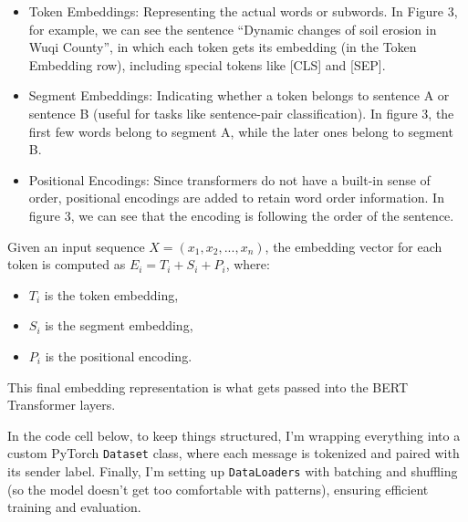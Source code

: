 \documentclass[11pt]{article}
\providecommand{\tightlist}{%
      \setlength{\itemsep}{0pt}\setlength{\parskip}{0pt}}
\begin{document}
\begin{itemize}
\tightlist
\item
  Token Embeddings: Representing the actual words or subwords. In Figure
  3, for example, we can see the sentence ``Dynamic changes of soil
  erosion in Wuqi County'', in which each token gets its embedding (in
  the Token Embedding row), including special tokens like {[}CLS{]} and
  {[}SEP{]}.
\item
  Segment Embeddings: Indicating whether a token belongs to sentence A
  or sentence B (useful for tasks like sentence-pair classification). In
  figure 3, the first few words belong to segment A, while the later
  ones belong to segment B.
\item
  Positional Encodings: Since transformers do not have a built-in sense
  of order, positional encodings are added to retain word order
  information. In figure 3, we can see that the encoding is following
  the order of the sentence.
\end{itemize}

Given an input sequence \(X = (x_1, x_2, ..., x_n)\), the embedding
vector for each token is computed as \(E_i = T_i + S_i + P_i\), where:

\begin{itemize}
\tightlist
\item
  \(T_i\) is the token embedding,
\item
  \(S_i\) is the segment embedding,
\item
  \(P_i\) is the positional encoding.
\end{itemize}

This final embedding representation is what gets passed into the BERT
Transformer layers.

In the code cell below, to keep things structured, I'm wrapping
everything into a custom PyTorch \texttt{Dataset} class, where each
message is tokenized and paired with its sender label. Finally, I'm
setting up \texttt{DataLoaders} with batching and shuffling (so the
model doesn't get too comfortable with patterns), ensuring efficient
training and evaluation.
\end{document}
